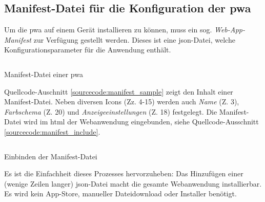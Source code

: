 


\subsection{Manifest-Datei für die Konfiguration der \ac{pwa}}
Um die \ac{pwa} auf einem Gerät installieren zu können, muss ein sog. \textit{Web-App-Manifest} zur Verfügung gestellt werden. Dieses ist eine \ac{json}-Datei, welche Konfigurationsparameter für die Anwendung enthält. \cite{GooglePWAManifest}

\begin{listing}[H]
    \inputminted{json}{src/2-1_manifest_sample.json}
    \caption{Manifest-Datei einer \ac{pwa}}
      \label{sourcecode:manifest_sample}
\end{listing}

Quellcode-Auschnitt \ref{sourcecode:manifest_sample} zeigt den Inhalt einer Manifest-Datei. Neben diversen Icons (Zz. 4-15) werden auch \textit{Name} (Z. 3), \textit{Farbschema} (Z. 20) und \textit{Anzeigeeinstellungen} (Z. 18) festgelegt.
Die Manifest-Datei wird im \acs{html} der Webanwendung eingebunden, siehe Quellcode-Ausschnitt \ref{sourcecode:manifest_include}. 

\begin{listing}[h!]
    \inputminted{xml}{src/2-2_include_manifest.html}
    \caption{Einbinden der Manifest-Datei}
      \label{sourcecode:manifest_include}
\end{listing}

Es ist die Einfachheit dieses Prozesses hervorzuheben: Das Hinzufügen einer (wenige Zeilen langer) \ac{json}-Datei macht die gesamte Webanwendung installierbar. Es wird kein App-Store, manueller Dateidownload oder Installer benötigt.
%



